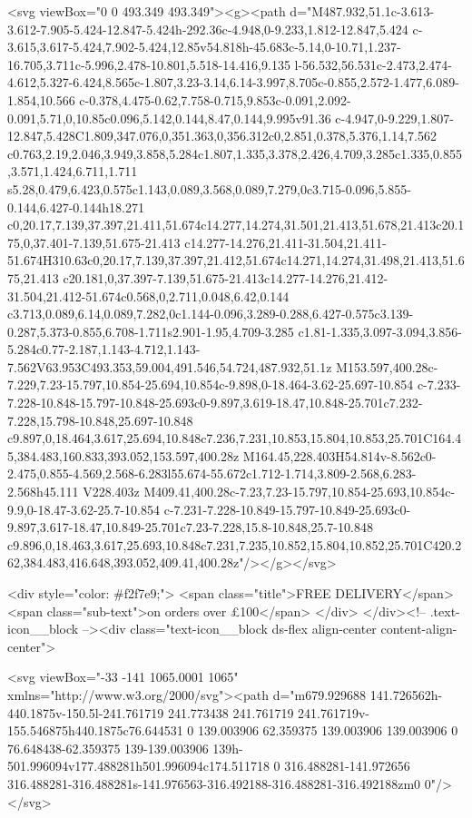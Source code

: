 {{{{{{{<svg viewBox="0 0 493.349 493.349"><g><path d="M487.932,51.1c-3.613-3.612-7.905-5.424-12.847-5.424h-292.36c-4.948,0-9.233,1.812-12.847,5.424 c-3.615,3.617-5.424,7.902-5.424,12.85v54.818h-45.683c-5.14,0-10.71,1.237-16.705,3.711c-5.996,2.478-10.801,5.518-14.416,9.135 l-56.532,56.531c-2.473,2.474-4.612,5.327-6.424,8.565c-1.807,3.23-3.14,6.14-3.997,8.705c-0.855,2.572-1.477,6.089-1.854,10.566 c-0.378,4.475-0.62,7.758-0.715,9.853c-0.091,2.092-0.091,5.71,0,10.85c0.096,5.142,0.144,8.47,0.144,9.995v91.36 c-4.947,0-9.229,1.807-12.847,5.428C1.809,347.076,0,351.363,0,356.312c0,2.851,0.378,5.376,1.14,7.562 c0.763,2.19,2.046,3.949,3.858,5.284c1.807,1.335,3.378,2.426,4.709,3.285c1.335,0.855,3.571,1.424,6.711,1.711 s5.28,0.479,6.423,0.575c1.143,0.089,3.568,0.089,7.279,0c3.715-0.096,5.855-0.144,6.427-0.144h18.271 c0,20.17,7.139,37.397,21.411,51.674c14.277,14.274,31.501,21.413,51.678,21.413c20.175,0,37.401-7.139,51.675-21.413 c14.277-14.276,21.411-31.504,21.411-51.674H310.63c0,20.17,7.139,37.397,21.412,51.674c14.271,14.274,31.498,21.413,51.675,21.413 c20.181,0,37.397-7.139,51.675-21.413c14.277-14.276,21.412-31.504,21.412-51.674c0.568,0,2.711,0.048,6.42,0.144 c3.713,0.089,6.14,0.089,7.282,0c1.144-0.096,3.289-0.288,6.427-0.575c3.139-0.287,5.373-0.855,6.708-1.711s2.901-1.95,4.709-3.285 c1.81-1.335,3.097-3.094,3.856-5.284c0.77-2.187,1.143-4.712,1.143-7.562V63.953C493.353,59.004,491.546,54.724,487.932,51.1z M153.597,400.28c-7.229,7.23-15.797,10.854-25.694,10.854c-9.898,0-18.464-3.62-25.697-10.854 c-7.233-7.228-10.848-15.797-10.848-25.693c0-9.897,3.619-18.47,10.848-25.701c7.232-7.228,15.798-10.848,25.697-10.848 c9.897,0,18.464,3.617,25.694,10.848c7.236,7.231,10.853,15.804,10.853,25.701C164.45,384.483,160.833,393.052,153.597,400.28z M164.45,228.403H54.814v-8.562c0-2.475,0.855-4.569,2.568-6.283l55.674-55.672c1.712-1.714,3.809-2.568,6.283-2.568h45.111 V228.403z M409.41,400.28c-7.23,7.23-15.797,10.854-25.693,10.854c-9.9,0-18.47-3.62-25.7-10.854 c-7.231-7.228-10.849-15.797-10.849-25.693c0-9.897,3.617-18.47,10.849-25.701c7.23-7.228,15.8-10.848,25.7-10.848 c9.896,0,18.463,3.617,25.693,10.848c7.231,7.235,10.852,15.804,10.852,25.701C420.262,384.483,416.648,393.052,409.41,400.28z"/></g></svg>


      <div style="color: #f2f7e9;">
        <span class="title">FREE DELIVERY</span>
        <span class="sub-text">on orders over £100</span>
      </div>
    </div><!-- .text-icon__block --><div class="text-icon__block ds-flex align-center content-align-center">
      
<svg viewBox="-33 -141 1065.0001 1065" xmlns="http://www.w3.org/2000/svg"><path d="m679.929688 141.726562h-440.1875v-150.5l-241.761719 241.773438 241.761719 241.761719v-155.546875h440.1875c76.644531 0 139.003906 62.359375 139.003906 139.003906 0 76.648438-62.359375 139-139.003906 139h-501.996094v177.488281h501.996094c174.511718 0 316.488281-141.972656 316.488281-316.488281s-141.976563-316.492188-316.488281-316.492188zm0 0"/></svg>

}}}}}}}
